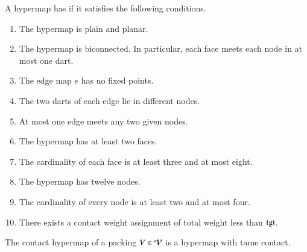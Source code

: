 \documentclass{llncs}
\def\op#1{{\hbox{#1}}}
\begin{document}
\begin{definition}
  A hypermap has  if it satisfies the following 
  conditions.
%
%
%
%
%
%
%
%
%
\begin{enumerate}
\item {} The hypermap is plain and planar.
\item {} The hypermap is biconnected.  In particular,
  each face meets each node in at most one dart.
\item {} The edge map $e$ has no fixed points.
\item {} The two darts of each edge lie in different
  nodes.
\item {} At most one edge meets any two given
  nodes.
\item {} The hypermap has at least two faces.
\item {} The cardinality of each face is at least three
  and at most eight.
\item {} The hypermap has twelve nodes.
\item {} The cardinality of every node is at least two  and at most four.
\item {} There exists a contact weight assignment of total
  weight less than $\op{tgt}$.
\end{enumerate}
%
\end{definition}



\begin{theorem} The contact hypermap of a 
  packing $V\in {\mathcal V}$ is a hypermap with tame contact.
\end{theorem}
%
%
%
%
\end{document}
